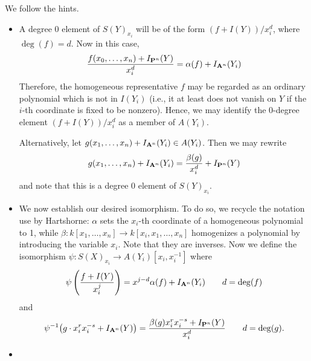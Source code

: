 \documentclass[10pt]{amsart}
\begin{document}
\begin{solution}
    \begin{luke}
        We follow the hints.
        \begin{itemize}
            \item A degree 0 element of $S(Y)_{x_i}$ will be of the 
            form $(f + I(Y))/x_i^d$, where $\deg(f) = d$. Now in this case, 
            \[
                \frac{f(x_0, \dots, x_n) + I_{\pp^n}(Y)}{x_i^d}
                =
                \alpha(f) + I_{\aa^n}(Y_i)
            \]
            Therefore, the homogeneous 
            representative $f$ may be regarded as an ordinary polynomial which is 
            not in $I(Y_i)$ (i.e., it at least does not vanish on $Y$ if the $i$-th coordinate is 
            fixed to be nonzero). Hence, we may identify the 0-degree element 
            $(f + I(Y))/x_i^d$ as a member of $A(Y_i)$. 
    
            Alternatively, let $g(x_1, \dots, x_n) + I_{\aa^n}(Y_i) \in A(Y_i)$. 
            Then we may rewrite 
            \[
                g(x_1, \dots, x_n) + I_{\aa^n}(Y_i) = \frac{\beta(g)}{x_i^d} + I_{\pp^n}(Y)
            \]
            and note that this is a degree 0 element of $S(Y)_{x_i}$.

            \item We now establish our desired isomorphism. To do so, we recycle the notation use by 
            Hartshorne: $\alpha$ sets the $x_i$-th coordinate of a homogeneous polynomial to 1, 
            while $\beta: k[x_1, \dots, x_n] \to k[x_i, x_1, \dots, x_n]$ homogenizes a polynomial 
            by introducing the variable $x_i$. 
            Note that they are inverses. Now we define the isomorphism
            $\psi: S(X)_{x_i} \to A(Y_i)[x_i, x_i^{-1}]$ where 
            \[
                \psi\left( \frac{f + I(Y)}{x_i^j} \right)
                =
                x^{j-d}\alpha(f) + I_{\aa^n}(Y_i)
                \qquad 
                d = \deg(f)
            \]
            and 
            \[
                \psi^{-1}\big(g \cdot x_i^{r}x_i^{-s} + I_{\aa^n}(Y)\big) = 
                \frac{\beta(g)x_i^{r}x_i^{-s} + I_{\pp^n}(Y)}{x_i^d}
                \qquad 
                d = \deg(g).
            \]
            \item  
        \end{itemize}

        

        
        
        
        


        
    
    \end{luke}
\end{solution}
\end{document}
